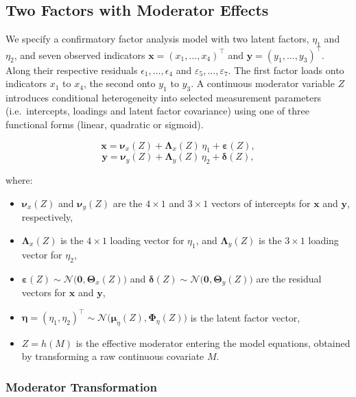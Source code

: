\documentclass[
  man,
  floatsintext]{apa7}
\providecommand{\tightlist}{%
  \setlength{\itemsep}{0pt}\setlength{\parskip}{0pt}}
\begin{document}
\subsection{Two Factors with Moderator
Effects}\label{two-factors-with-moderator-effects}

We specify a confirmatory factor analysis model with two latent factors,
\(\eta_1\) and \(\eta_2\), and seven observed indicators
\(\mathbf{x} = (x_1, \dots, x_4)^\top\) and
\(\mathbf{y} = (y_1, \dots, y_3)^\top\). Along their respective
residuals \({\epsilon_1,...,\epsilon_4}\) and
\({\varepsilon_5,..., \varepsilon_7}\). The first factor loads onto
indicators \(x_1\) to \(x_4\), the second onto \(y_1\) to \(y_3\). A
continuous moderator variable \(Z\) introduces conditional heterogeneity
into selected measurement parameters (i.e.~intercepts, loadings and
latent factor covariance) using one of three functional forms (linear,
quadratic or sigmoid).

\[
\mathbf{x} = \boldsymbol{\nu}_x(Z) + \boldsymbol{\Lambda}_x(Z)\,\eta_1 + \boldsymbol{\varepsilon}(Z),
\] \[
\mathbf{y} = \boldsymbol{\nu}_y(Z) + \boldsymbol{\Lambda}_y(Z)\,\eta_2 + \boldsymbol{\delta}(Z),
\]

where:

\begin{itemize}
\tightlist
\item
  \(\boldsymbol{\nu}_x(Z)\) and \(\boldsymbol{\nu}_y(Z)\) are the
  \(4 \times 1\) and \(3 \times 1\) vectors of intercepts for
  \(\mathbf{x}\) and \(\mathbf{y}\), respectively,
\item
  \(\boldsymbol{\Lambda}_x(Z)\) is the \(4 \times 1\) loading vector for
  \(\eta_1\), and \(\boldsymbol{\Lambda}_y(Z)\) is the \(3 \times 1\)
  loading vector for \(\eta_2\),
\item
  \(\boldsymbol{\varepsilon}(Z) \sim \mathcal{N}\bigl(\mathbf{0}, \boldsymbol{\Theta}_x(Z)\bigr)\)
  and
  \(\boldsymbol{\delta}(Z) \sim \mathcal{N}\bigl(\mathbf{0}, \boldsymbol{\Theta}_y(Z)\bigr)\)
  are the residual vectors for \(\mathbf{x}\) and \(\mathbf{y}\),
\item
  \(\boldsymbol{\eta} = (\eta_1, \eta_2)^\top \sim \mathcal{N}\bigl(\boldsymbol{\mu}_\eta(Z), \boldsymbol{\Phi}_\eta(Z)\bigr)\)
  is the latent factor vector,
\item
  \(Z = h(M)\) is the effective moderator entering the model equations,
  obtained by transforming a raw continuous covariate \(M\).
\end{itemize}

\subsubsection{Moderator
Transformation}\label{moderator-transformation-1}
\end{document}
